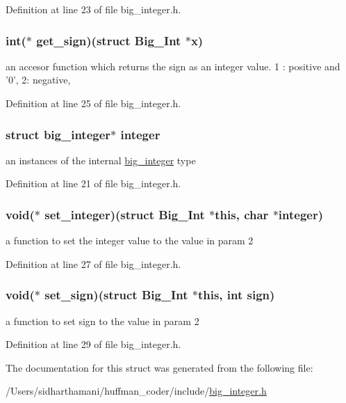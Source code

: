 Definition at line 23 of file big\-\_\-integer.\-h.

\hypertarget{struct_big___int_ae06ba678ba07ecdac264605bc8576da2}{
\subsubsection[{get\-\_\-sign}]{\setlength{\rightskip}{0pt plus 5cm}int($\ast$ get\-\_\-sign)(struct {\bf Big\-\_\-\-Int} $\ast$x)}}\label{struct_big___int_ae06ba678ba07ecdac264605bc8576da2}
an accesor function which returns the sign as an integer value. 1 \-: positive and '0', 2\-: negative, 

Definition at line 25 of file big\-\_\-integer.\-h.

\hypertarget{struct_big___int_af78495b20eeda6242727ea99032693c2}{
\subsubsection[{integer}]{\setlength{\rightskip}{0pt plus 5cm}struct {\bf big\-\_\-integer}$\ast$ integer}}\label{struct_big___int_af78495b20eeda6242727ea99032693c2}
an instances of the internal \hyperlink{big__integer__impl_8h_structbig__integer}{big\-\_\-integer} type 

Definition at line 21 of file big\-\_\-integer.\-h.

\hypertarget{struct_big___int_a34a65fb8d8cc2acf5a14a18c420ee774}{
\subsubsection[{set\-\_\-integer}]{\setlength{\rightskip}{0pt plus 5cm}void($\ast$ set\-\_\-integer)(struct {\bf Big\-\_\-\-Int} $\ast$this, char $\ast${\bf integer})}}\label{struct_big___int_a34a65fb8d8cc2acf5a14a18c420ee774}
a function to set the integer value to the value in param 2 

Definition at line 27 of file big\-\_\-integer.\-h.

\hypertarget{struct_big___int_a70cf790b3af136aad25fa028cde3e801}{
\subsubsection[{set\-\_\-sign}]{\setlength{\rightskip}{0pt plus 5cm}void($\ast$ set\-\_\-sign)(struct {\bf Big\-\_\-\-Int} $\ast$this, int sign)}}\label{struct_big___int_a70cf790b3af136aad25fa028cde3e801}
a function to set sign to the value in param 2 

Definition at line 29 of file big\-\_\-integer.\-h.



The documentation for this struct was generated from the following file\-:\begin{DoxyCompactItemize}
\item 
/\-Users/sidharthamani/huffman\-\_\-coder/include/\hyperlink{big__integer_8h}{big\-\_\-integer.\-h}\end{DoxyCompactItemize}

